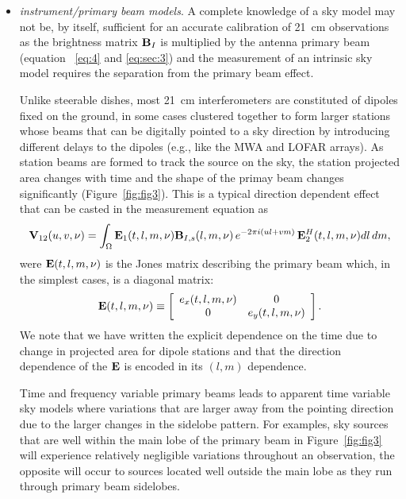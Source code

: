 \begin{itemize}
\item {\it instrument/primary beam models}. A complete knowledge of a sky model may not be, by itself, sufficient for an accurate calibration of 21~cm observations as the brightness matrix ${\bf B}_I$ is multiplied by the antenna primary beam (equation~ \ref{eq:4} and \ref{eq:sec:3}) and the measurement of an intrinsic sky model requires the separation from the primary beam effect. 

Unlike steerable dishes, most 21~cm interferometers are constituted of dipoles fixed on the ground, in some cases clustered together to form larger stations whose beams that can be digitally pointed to a sky direction by introducing different delays to the dipoles (e.g., like the MWA and LOFAR arrays). As station beams are formed to track the source on the sky, the station projected area changes with time and the shape of the primay beam changes significantly (Figure~\ref{fig:fig3}). This is a typical direction dependent effect that can be casted in the measurement equation as
\begin{equation}
{\bf V}_{12} (u,v,\nu) = \int_\Omega {\bf E}_1 (t, l, m, \nu) {\bf B}_{I,s} (l, m, \nu) \, e^{-2 \pi i (ul + vm)} \, {\bf E}_2^H (t, l, m, \nu)  dl \, dm,
\label{eq:sec:7_added_2}
\end{equation}
were ${\bf E} (t, l, m, \nu)$ is the Jones matrix describing the primary beam which, in the simplest cases, is a diagonal matrix:
\begin{equation}
    {\bf E} (t, l, m, \nu) \equiv 
    \left[
    \begin{array}{cc}
    e_x (t, l, m, \nu) 	& 	0 	\\
    0 		& e_y (t, l, m, \nu) 	\\
    \end{array}
    \right].
\label{eq:sec:4}
\end{equation} 
We note that we have written the explicit dependence on the time due to change in projected area for dipole stations and that the direction dependence of the ${\bf E}$ is encoded in its $(l, m)$ dependence.

Time and frequency variable primary beams leads to apparent time variable sky models where variations that are larger away from the pointing direction due to the larger changes in the sidelobe pattern. For examples, sky sources that are well within the main lobe of the primary beam in Figure~\ref{fig:fig3} will experience relatively negligible variations throughout an observation, the opposite will occur to sources located well outside the main lobe as they run through primary beam sidelobes.


\end{itemize}
